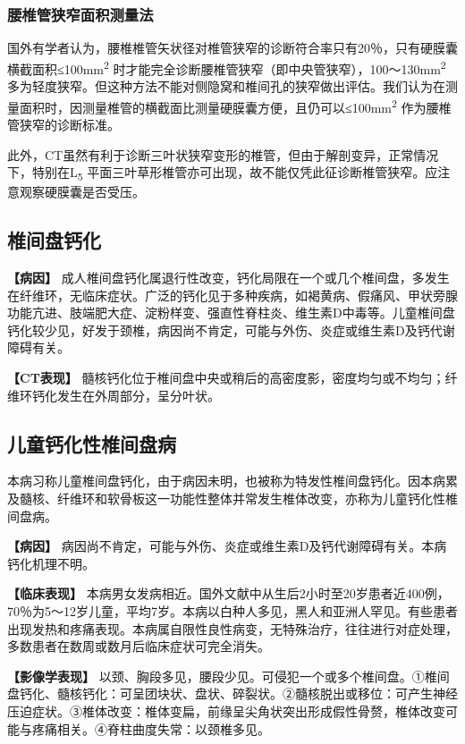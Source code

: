 \subsubsection{腰椎管狭窄面积测量法}

国外有学者认为，腰椎椎管矢状径对椎管狭窄的诊断符合率只有20％，只有硬膜囊横截面积≤100mm\textsuperscript{2}
时才能完全诊断腰椎管狭窄（即中央管狭窄），100～130mm\textsuperscript{2}
多为轻度狭窄。但这种方法不能对侧隐窝和椎间孔的狭窄做出评估。我们认为在测量面积时，因测量椎管的横截面比测量硬膜囊方便，且仍可以≤100mm\textsuperscript{2}
作为腰椎管狭窄的诊断标准。

此外，CT虽然有利于诊断三叶状狭窄变形的椎管，但由于解剖变异，正常情况下，特别在L\textsubscript{5}
平面三叶草形椎管亦可出现，故不能仅凭此征诊断椎管狭窄。应注意观察硬膜囊是否受压。

\subsection{椎间盘钙化}

\textbf{【病因】}
成人椎间盘钙化属退行性改变，钙化局限在一个或几个椎间盘，多发生在纤维环，无临床症状。广泛的钙化见于多种疾病，如褐黄病、假痛风、甲状旁腺功能亢进、肢端肥大症、淀粉样变、强直性脊柱炎、维生素D中毒等。儿童椎间盘钙化较少见，好发于颈椎，病因尚不肯定，可能与外伤、炎症或维生素D及钙代谢障碍有关。

\textbf{【CT表现】}
髓核钙化位于椎间盘中央或稍后的高密度影，密度均匀或不均匀；纤维环钙化发生在外周部分，呈分叶状。

\subsection{儿童钙化性椎间盘病}

本病习称儿童椎间盘钙化，由于病因未明，也被称为特发性椎间盘钙化。因本病累及髓核、纤维环和软骨板这一功能性整体并常发生椎体改变，亦称为儿童钙化性椎间盘病。

\textbf{【病因】}
病因尚不肯定，可能与外伤、炎症或维生素D及钙代谢障碍有关。本病钙化机理不明。

\textbf{【临床表现】}
本病男女发病相近。国外文献中从生后2小时至20岁患者近400例，70％为5～12岁儿童，平均7岁。本病以白种人多见，黑人和亚洲人罕见。有些患者出现发热和疼痛表现。本病属自限性良性病变，无特殊治疗，往往进行对症处理，多数患者在数周或数月后临床症状可完全消失。

\textbf{【影像学表现】}
以颈、胸段多见，腰段少见。可侵犯一个或多个椎间盘。①椎间盘钙化、髓核钙化：可呈团块状、盘状、碎裂状。②髓核脱出或移位：可产生神经压迫症状。③椎体改变：椎体变扁，前缘呈尖角状突出形成假性骨赘，椎体改变可能与疼痛相关。④脊柱曲度失常：以颈椎多见。

